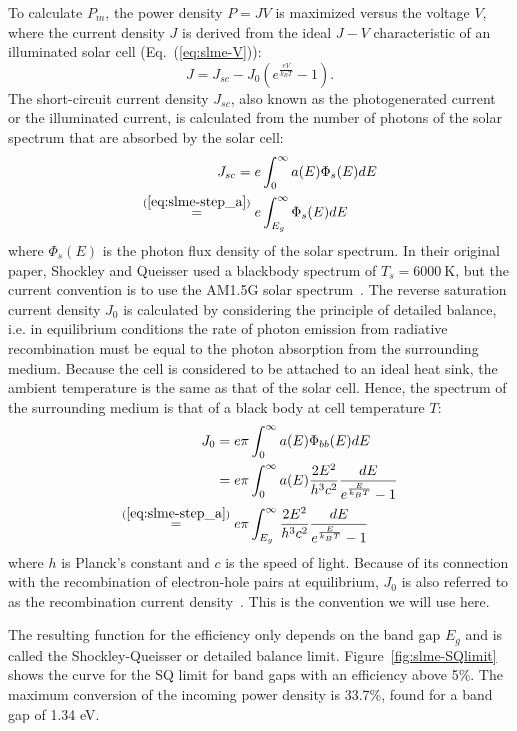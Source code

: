 \begin{refsection}
To calculate $P_m$, the power density $P = JV$ is maximized versus the voltage $V$, where the current density $J$ is derived from the ideal $J-V$ characteristic of an illuminated solar cell (Eq.~(\ref{eq:slme-V})):
\begin{equation}\label{eq:slme-JV}
J = J_{sc} - J_0 \left(e^{\frac{eV}{k_B T}} - 1\right).
\end{equation}
The short-circuit current density $J_{sc}$, also known as the photogenerated current or the illuminated current, is calculated from the number of photons of the solar spectrum that are absorbed by the solar cell:
\begin{align}
J_{sc} = e &\int_0^{\infty} a(E) \Phi_s (E) dE \\
\stackrel{(\ref{eq:slme-step_a})}{=} e &\int_{E_g}^{\infty} \Phi_s (E) dE \label{eq:slme-Ish}
\end{align}
where $\Phi_s(E)$ is the photon flux density of the solar spectrum. In their original paper, Shockley and Queisser used a blackbody spectrum of $T_s = 6000~\si{\kelvin}$, but the current convention is to use the AM1.5G solar spectrum~\cite{International2012}.  The reverse saturation current density $J_0$ is calculated by considering the principle of detailed balance, i.e. in equilibrium conditions the rate of photon emission from radiative recombination must be equal to the photon absorption from the surrounding medium. Because the cell is considered to be attached to an ideal heat sink, the ambient temperature is the same as that of the solar cell. Hence, the spectrum of the surrounding medium is that of a black body at cell temperature $T$:
\begin{align}
J_0 = e \pi &\int_0^{\infty} a(E) \Phi_{bb}(E) dE\nonumber \\
= e \pi &\int_0^{\infty} a(E) \frac{2E^2}{h^3 c^2} \frac{dE}{e^{\frac{E}{k_B T}}-1} \\
\stackrel{(\ref{eq:slme-step_a})}{=} e \pi &\int_{E_g}^{\infty} \frac{2E^2}{h^3 c^2} \frac{dE}{e^{\frac{E}{k_B T}}-1} \label{eq:slme-I0}
\end{align}
where $h$ is Planck's constant and $c$ is the speed of light. Because of its connection with the recombination of electron-hole pairs at equilibrium, $J_0$ is also referred to as the recombination current density~\cite{Cuevas2014}. This is the convention we will use here.

The resulting function for the efficiency only depends on the band gap $E_g$ and is called the Shockley-Queisser or detailed balance limit. Figure~\ref{fig:slme-SQlimit} shows the curve for the SQ limit for band gaps with an efficiency above 5\%. The maximum conversion of the incoming power density is 33.7\%, found for a band gap of 1.34 eV.


\end{refsection}
